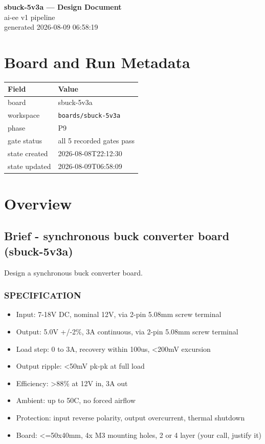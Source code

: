 \documentclass[11pt,a4paper]{article}
\begin{document}
\sloppy
\begin{center}
{\LARGE\bfseries sbuck-5v3a --- Design Document}\\[6pt]
{\large ai-ee v1 pipeline}\\[2pt]
generated 2026-08-09 06:58:19
\end{center}
\tableofcontents

\section{Board and Run Metadata}
{\small
\begin{longtable}{lp{11cm}}
\toprule
\textbf{Field} & \textbf{Value} \\
\midrule
\endhead
board & sbuck-5v3a \\
workspace & \texttt{boards/sbuck-5v3a} \\
phase & P9 \\
gate status & all 5 recorded gates pass \\
state created & 2026-08-08T22:12:30 \\
state updated & 2026-08-09T06:58:09 \\
\bottomrule
\end{longtable}
}
\section{Overview}
\subsection*{Brief - synchronous buck converter board (sbuck-5v3a)}
Design a synchronous buck converter board.

\subsubsection*{SPECIFICATION}
\begin{itemize}
\item Input:        7-18V DC, nominal 12V, via 2-pin 5.08mm screw terminal
\item Output:       5.0V +/-2\%, 3A continuous, via 2-pin 5.08mm screw terminal
\item Load step:    0 to 3A, recovery within 100us, \textless{}200mV excursion
\item Output ripple: \textless{}50mV pk-pk at full load
\item Efficiency:   \textgreater{}88\% at 12V in, 3A out
\item Ambient:      up to 50C, no forced airflow
\item Protection:   input reverse polarity, output overcurrent, thermal shutdown
\item Board:        \textless{}=50x40mm, 4x M3 mounting holes, 2 or 4 layer (your call, justify it)
\end{itemize}
\end{document}
